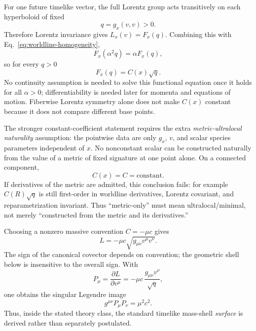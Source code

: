 \documentclass[11pt,a4paper]{article}
\begin{document}
For one future timelike vector, the full Lorentz group acts transitively on each hyperboloid of fixed
\begin{equation}
q=g_x(v,v)>0.
\end{equation}
Therefore Lorentz invariance gives $L_x(v)=F_x(q)$.  Combining this with Eq.~\eqref{eq:worldline-homogeneity},
\begin{equation}
F_x(\alpha^2q)=\alpha F_x(q),
\end{equation}
so for every $q>0$
\begin{equation}
\boxed{F_x(q)=C(x)\sqrt q}.
\label{eq:worldline-Cx}
\end{equation}
No continuity assumption is needed to solve this functional equation once it holds for all $\alpha>0$; differentiability is needed later for momenta and equations of motion.  Fiberwise Lorentz symmetry alone does not make $C(x)$ constant because it does not compare different base points.

The stronger constant-coefficient statement requires the extra \emph{metric-ultralocal naturality} assumption: the pointwise data are only $g_x$, $v$, and scalar species parameters independent of $x$.  No nonconstant scalar can be constructed naturally from the value of a metric of fixed signature at one point alone.  On a connected component,
\begin{equation}
C(x)=C=\text{constant}.
\end{equation}
If derivatives of the metric are admitted, this conclusion fails: for example $C(R)\sqrt q$ is still first-order in worldline derivatives, Lorentz covariant, and reparametrization invariant.  Thus ``metric-only'' must mean ultralocal/minimal, not merely ``constructed from the metric and its derivatives.''

Choosing a nonzero massive convention $C=-\mu c$ gives
\begin{equation}
L=-\mu c\sqrt{g_{\mu\nu}v^\mu v^\nu}.
\label{eq:worldline-square-root}
\end{equation}
The sign of the canonical covector depends on convention; the geometric shell below is insensitive to the overall sign.  With
\begin{equation}
P_\mu=\frac{\partial L}{\partial v^\mu}
=-\mu c\,\frac{g_{\mu\nu}v^\nu}{\sqrt q},
\end{equation}
one obtains the singular Legendre image
\begin{equation}
\boxed{g^{\mu\nu}P_\mu P_\nu=\mu^2c^2}.
\label{eq:worldline-shell}
\end{equation}
Thus, inside the stated theory class, the standard timelike mass-shell \emph{surface} is derived rather than separately postulated.
\end{document}
